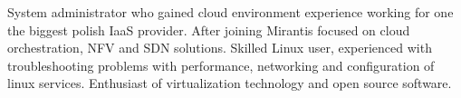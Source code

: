 

\begin{cvparagraph}

  System administrator who gained cloud environment experience working for one
  the biggest polish IaaS provider. After joining Mirantis focused on cloud orchestration,
  NFV and SDN solutions. Skilled Linux user, experienced with troubleshooting problems with
  performance, networking and configuration of linux services. Enthusiast of virtualization
  technology and open source software.
\end{cvparagraph}
